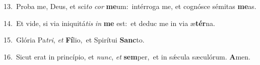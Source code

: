 {\numbfont\textcolor{\numbcolor}{13.}}~Proba me, Deus, et sci\textit{to} \textit{cor} \textbf{me}\-um:~\star intérroga me, et cognósce sémitas \textbf{me}\-as.\par
{\numbfont\textcolor{\numbcolor}{14.}}~Et vide, si via iniquitá\textit{tis} \textit{in} \textbf{me} est:~\star et deduc me in via æ\-\textbf{tér}\-na.\par
{\numbfont\textcolor{\numbcolor}{15.}}~Glória Pa\-\textit{tri}\-, \textit{et} \textbf{Fí}\-lio,~\star et Spirítui \textbf{Sanc}\-to.\par
{\numbfont\textcolor{\numbcolor}{16.}}~Sicut erat in princípio, et \textit{nunc}\-, \textit{et} \textbf{sem}\-per,~\star et in sǽcula sæculórum. \textbf{A}\-men.\par
